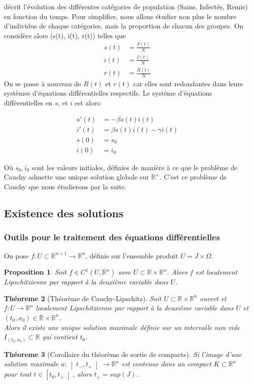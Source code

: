 \documentclass[a4paper]{article}
\theoremstyle{plain}
\newtheorem{thm}{Théoreme}[section]
\newtheorem{prop}[thm]{Proposition}
\theoremstyle{definition}
\theoremstyle{remark}
\begin{document}
décrit l'évolution des différentes catégories de population (Sains, Infectés, Remis) en fonction du temps. Pour simplifier, nous allons étudier non plus le nombre d'individus de chaque catégories, mais la proportion de chacun des groupes. On considère alors (s(t), i(t), r(t)) telles que
\begin{align*}
s(t)&=\frac{S(t)}{N}\\
i(t)&=\frac{I(t)}{N}\\
r(t)&=\frac{R(t)}{N}
\end{align*}
On se passe à nouveau de $R(t)$ et $r(t)$ car elles sont redondantes dans leurs systèmes d'équations différentielles respectifs. 
Le système d'équations différentielles en $s$, et $i$ est alors:

\begin{align}
    \label{cauchy1}
    s'(t)&= - \beta s(t)i(t) \\
    \label{cauchy2}
    i'(t)&= \beta s(t)i(t) - \gamma i(t) \\
    \label{cauchy3}
    s(0)&= s_{0} \\
    \label{cauchy4}
    i(0)&= i_{0} 
\end{align}

Où $s_0, i_0 $ sont les valeurs initiales, définies de manière à ce que le problème de Cauchy admette une unique solution globale sur $\mathbb{R}^+$.
C'est ce problème de Cauchy que nous étudierons par la suite.
\subsection{Existence des solutions}
	\subsubsection{Outils pour le traitement des équations différentielles}
	On pose $f:U\subset\mathbb{R}^{n+1}\rightarrow\mathbb{R}^n$, définie sur l'ensemble produit $U=J\times\Omega$.
\begin{prop}
	Soit $f\in C^1(U, \mathbb{R}^n)$ avec $U\subset\mathbb{R}\times\mathbb{R}^n$. Alors $f$ est localement Lipschitzienne par rapport à la deuxième variable dans $U$.
\end{prop}
\begin{thm}[Théorème de Cauchy-Lipschitz]
\label{CL}
Soit $U\subset\mathbb{R}\times\mathbb{R}^n$ ouvert et $f: U\rightarrow \mathbb{R}^n$ localement Lipschitzienne par rapport à la deuxième variable dans $U$ et $(t_0,x_0)\in\mathbb{R}\times\mathbb{R}^n$.\\ Alors il existe une unique solution maximale définie sur un intervalle non vide $I_{(t_0, x_0)}\subset\mathbb{R}$ qui contient $t_0$.
\end{thm}
\begin{thm}[Corollaire du théorème de sortie de compacts]
\label{compact}
 Si l'image d'une solution maximale $u: \left]t_-, t_+\right[\rightarrow\mathbb{R}^n$ est contenue dans un compact $K\subset\mathbb{R}^n$ pour tout $t\in\left[t_0, t_+\right[$, alors $t_+=sup(J)$.
\end{thm}
\end{document}
